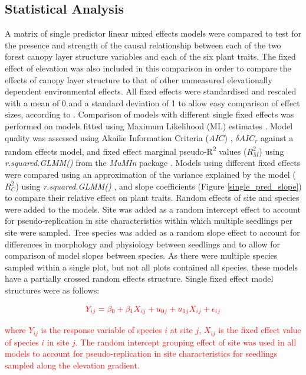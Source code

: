 \documentclass[a4paper, 11pt]{article}
\newcommand{\todo}[1]{\textcolor{red}{#1}}   %
\begin{document}



\subsection{Statistical Analysis}

A matrix of single predictor linear mixed effects models were compared to test for the presence and strength of the causal relationship between each of the two forest canopy layer structure variables and each of the six plant traits. The fixed effect of elevation was also included in this comparison in order to compare the effects of canopy layer structure to that of other unmeasured elevationally dependent environmental effects. All fixed effects were standardised and rescaled with a mean of 0 and a standard deviation of 1 to allow easy comparison of effect sizes, according to \citep{Grueber2011}. Comparison of models with different single fixed effects was performed on models fitted using Maximum Likelihood (ML) estimates \citep{Bolker2008}. Model quality was assessed using Akaike Information Criteria ($AIC$) \citep{Akaike1992}, $\delta{}AIC_r$ against a random effects model, and fixed effect marginal pseudo-R\textsuperscript{2} values ($R_M^2$) using \textit{r.squared.GLMM()} from the \textit{MuMIn} package \citep{MuMIn}. Models using different fixed effects were compared using an approximation of the variance explained by the model ($R_C^2$) using \textit{r.squared.GLMM()} \citep{MuMIn}, and slope coefficients (Figure \ref{single_pred_slope}) to compare their relative effect on plant traits. Random effects of site and species were added to the models. Site was added as a random intercept effect to account for pseudo-replication in site characteristics within which multiple seedlings per site were sampled. Tree species was added as a random slope effect to account for differences in morphology and physiology between seedlings and to allow for comparison of model slopes between species. As there were multiple species sampled within a single plot, but not all plots contained all species, these models have a partially crossed random effects structure. Single fixed effect model structures were as follows:

\begin{equation}
\label{eq:slope_model}
\todo{Y_{ij} = \beta_{0} + \beta_{1}X_{ij} + u_{0j} + u_{1j}X_{ij} + \epsilon_{ij}}
\end{equation}

\todo{where $Y_{ij}$ is the response variable of species $i$ at site $j$, $X_{ij}$ is the fixed effect value of species $i$ in site $j$. The random intercept grouping effect of site was used in all models to account for pseudo-replication in site characteristics for seedlings sampled along the elevation gradient.}
\end{document}
